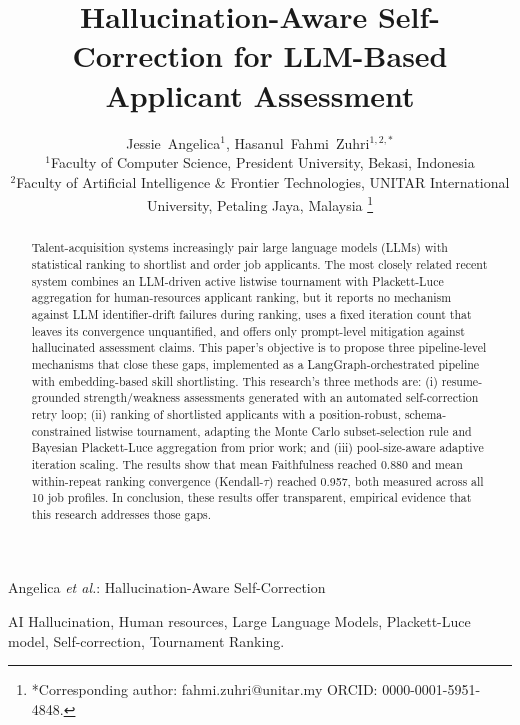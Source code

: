 \documentclass[journal]{IEEEtran}
\begin{document}
\title{Hallucination-Aware Self-Correction for LLM-Based Applicant Assessment}

\author{Jessie~Angelica$^{1}$, Hasanul~Fahmi~Zuhri$^{1,2,*}$\\[0.5em]
{\normalsize $^{1}$Faculty of Computer Science, President University, Bekasi, Indonesia\\
$^{2}$Faculty of Artificial Intelligence \& Frontier Technologies, UNITAR International University, Petaling Jaya, Malaysia}%
\thanks{*Corresponding author: fahmi.zuhri@unitar.my \; ORCID: 0000-0001-5951-4848.}}

%
{Angelica \MakeLowercase{\textit{et al.}}: Hallucination-Aware Self-Correction}

\maketitle

\begin{abstract}
Talent-acquisition systems increasingly pair large language models (LLMs) with statistical ranking to shortlist and order job applicants. The most closely related recent system combines an LLM-driven active listwise tournament with Plackett-Luce aggregation for human-resources applicant ranking, but it reports no mechanism against LLM identifier-drift failures during ranking, uses a fixed iteration count that leaves its convergence unquantified, and offers only prompt-level mitigation against hallucinated assessment claims. This paper's objective is to propose three pipeline-level mechanisms that close these gaps, implemented as a LangGraph-orchestrated pipeline with embedding-based skill shortlisting. This research's three methods are: (i) resume-grounded strength/weakness assessments generated with an automated self-correction retry loop; (ii) ranking of shortlisted applicants with a position-robust, schema-constrained listwise tournament, adapting the Monte Carlo subset-selection rule and Bayesian Plackett-Luce aggregation from prior work; and (iii) pool-size-aware adaptive iteration scaling. The results show that mean Faithfulness reached 0.880 and mean within-repeat ranking convergence (Kendall-$\tau$) reached 0.957, both measured across all 10 job profiles. In conclusion, these results offer transparent, empirical evidence that this research addresses those gaps.
\end{abstract}

\begin{IEEEkeywords}
AI Hallucination, Human resources, Large Language Models, Plackett-Luce model, Self-correction, Tournament Ranking.
\end{IEEEkeywords}
\end{document}
